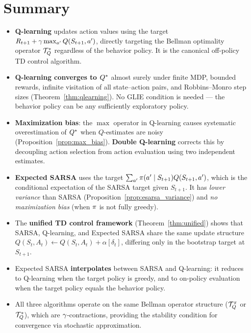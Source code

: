 \documentclass[11pt,a4paper]{article}
\begin{document}
\section{Summary}
\label{sec:summary}

\begin{itemize}
  \item \textbf{Q-learning} updates action values using the target
    $R_{t+1} + \gamma \max_{a'} Q(S_{t+1}, a')$, directly
    targeting the Bellman optimality operator $\mathcal{T}^*_Q$
    regardless of the behavior policy. It is the canonical
    off-policy TD control algorithm.

  \item \textbf{Q-learning converges to $Q^*$} almost surely
    under finite MDP, bounded rewards, infinite visitation of all
    state--action pairs, and Robbins--Monro step sizes
    (Theorem~\ref{thm:qlearning}). No GLIE condition is needed ---
    the behavior policy can be any sufficiently exploratory policy.

  \item \textbf{Maximization bias}: the $\max$ operator in
    Q-learning causes systematic overestimation of $Q^*$ when
    $Q$-estimates are noisy
    (Proposition~\ref{prop:max_bias}).
    \textbf{Double Q-learning} corrects this by decoupling action
    selection from action evaluation using two independent estimates.

  \item \textbf{Expected SARSA} uses the target
    $\sum_{a'} \pi(a' \mid S_{t+1}) Q(S_{t+1}, a')$,
    which is the conditional expectation of the SARSA target given
    $S_{t+1}$. It has \emph{lower variance} than SARSA
    (Proposition~\ref{prop:esarsa_variance}) and \emph{no
    maximization bias} (when $\pi$ is not fully greedy).

  \item The \textbf{unified TD control framework}
    (Theorem~\ref{thm:unified}) shows that SARSA, Q-learning, and
    Expected SARSA share the same update structure
    $Q(S_t,A_t) \leftarrow Q(S_t,A_t) + \alpha[\delta_t]$, differing
    only in the bootstrap target at $S_{t+1}$.

  \item Expected SARSA \textbf{interpolates} between SARSA and
    Q-learning: it reduces to Q-learning when the target policy is
    greedy, and to on-policy evaluation when the target policy
    equals the behavior policy.

  \item All three algorithms operate on the same Bellman operator
    structure ($\mathcal{T}^\pi_Q$ or $\mathcal{T}^*_Q$), which
    are $\gamma$-contractions, providing the stability condition
    for convergence via stochastic approximation.
\end{itemize}
\end{document}

